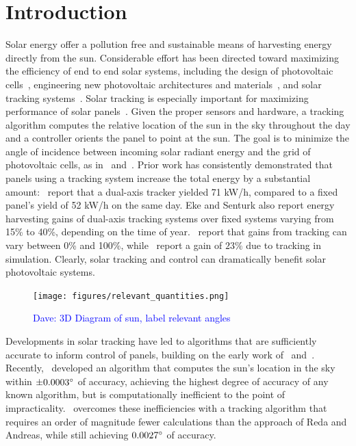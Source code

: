 \documentclass{article}
\newcommand{\dnote}[1]{\textcolor{blue}{Dave: #1}}
\begin{document}
\section{Introduction}
Solar energy offer a pollution free and sustainable means of harvesting energy directly from the sun. Considerable effort has been directed toward maximizing the efficiency of end to end solar systems, including the design of photovoltaic cells~\cite{Jervase2001,li2012molecular}, engineering new photovoltaic architectures and materials~\cite{li2005high}, and solar tracking systems~\cite{camacho2012control}. Solar tracking is especially important for maximizing performance of solar panels~\cite{Eke2012,Rizk2008,King2001}. Given the proper sensors and hardware, a tracking algorithm computes the relative location of the sun in the sky throughout the day and a controller orients the panel to point at the sun. The goal is to minimize the angle of incidence between incoming solar radiant energy and the grid of photovoltaic cells, as in~\citet{Eke2012,Benghanem2011,King2001} and~\citet{kalogirou1996design}. Prior work has consistently demonstrated that panels using a tracking system increase the total energy by a substantial amount:~\citet{Eke2012} report that a dual-axis tracker yielded 71 kW/h, compared to a fixed panel's yield of 52 kW/h on the same day. Eke and Senturk also report energy harvesting gains of dual-axis tracking systems over fixed systems varying from 15\% to 40\%, depending on the time of year.~\citet{mousazadeh2009review} report that gains from tracking can vary between 0\% and 100\%, while~\citet{clifford2004design} report a gain of $23\%$ due to tracking in simulation. Clearly, solar tracking and control can dramatically benefit solar photovoltaic systems.

\begin{figure}[t]
\begin{center}
\texttt{[image: figures/relevant\_quantities.png]}
\caption{\dnote{3D Diagram of sun, label relevant angles}}
\end{center}
\end{figure}

Developments in solar tracking have led to algorithms that are sufficiently accurate to inform control of panels, building on the early work of~\citet{spencer1971fourier,walraven1978calculating} and~\citet{michalsky1988astronomical}. Recently,~\citet{reda2004solar} developed an algorithm that computes the sun's location in the sky within $\pm 0.0003\degree$ of accuracy, achieving the highest degree of accuracy of any known algorithm, but is computationally inefficient to the point of impracticality.~\citet{Grena2008} overcomes these inefficiencies with a tracking algorithm that requires an order of magnitude fewer calculations than the approach of Reda and Andreas, while still achieving $0.0027\degree$ of accuracy.
\end{document}
